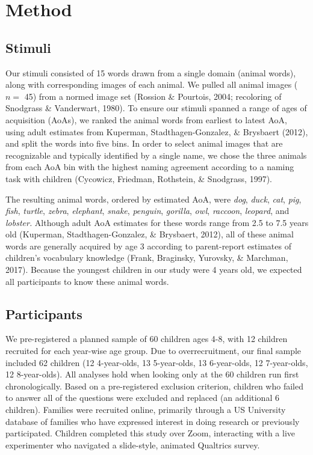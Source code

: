 \documentclass[10pt, letterpaper]{article}
\begin{document}
\hypertarget{method}{%
\section{Method}\label{method}}

\hypertarget{stimuli}{%
\subsection{Stimuli}\label{stimuli}}

Our stimuli consisted of 15 words drawn from a single domain (animal
words), along with corresponding images of each animal. We pulled all
animal images (\(n =\) 45) from a normed image set (Rossion \& Pourtois,
2004; recoloring of Snodgrass \& Vanderwart, 1980). To ensure our
stimuli spanned a range of ages of acquisition (AoAs), we ranked the
animal words from earliest to latest AoA, using adult estimates from
Kuperman, Stadthagen-Gonzalez, \& Brysbaert (2012), and split the words
into five bins. In order to select animal images that are recognizable
and typically identified by a single name, we chose the three animals
from each AoA bin with the highest naming agreement according to a
naming task with children (Cycowicz, Friedman, Rothstein, \& Snodgrass,
1997).

The resulting animal words, ordered by estimated AoA, were \emph{dog},
\emph{duck}, \emph{cat}, \emph{pig}, \emph{fish}, \emph{turtle},
\emph{zebra}, \emph{elephant}, \emph{snake}, \emph{penguin},
\emph{gorilla}, \emph{owl}, \emph{raccoon}, \emph{leopard}, and
\emph{lobster.} Although adult AoA estimates for these words range from
2.5 to 7.5 years old (Kuperman, Stadthagen-Gonzalez, \& Brysbaert,
2012), all of these animal words are generally acquired by age 3
according to parent-report estimates of children's vocabulary knowledge
(Frank, Braginsky, Yurovsky, \& Marchman, 2017). Because the youngest
children in our study were 4 years old, we expected all participants to
know these animal words.

\hypertarget{participants}{%
\subsection{Participants}\label{participants}}

We pre-registered a planned sample of 60 children ages 4-8, with 12
children recruited for each year-wise age group. Due to overrecruitment,
our final sample included 62 children (12 4-year-olds, 13 5-year-olds,
13 6-year-olds, 12 7-year-olds, 12 8-year-olds). All analyses hold when
looking only at the 60 children run first chronologically. Based on a
pre-registered exclusion criterion, children who failed to answer all of
the questions were excluded and replaced (an additional 6 children).
Families were recruited online, primarily through a US University
database of families who have expressed interest in doing research or
previously participated. Children completed this study over Zoom,
interacting with a live experimenter who navigated a slide-style,
animated Qualtrics survey.
\end{document}
